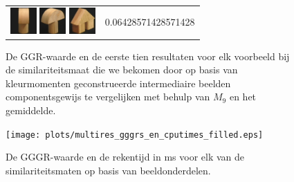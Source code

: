 {\begin{figure}[p]
\begin{tabular}{m{11cm} | m{3cm} |}
\includegraphics[width=1cm]{coil/beeld-5.eps}
\includegraphics[width=1cm]{coil/beeld-3.eps}
\includegraphics[width=1cm]{coil/beeld-45.eps}
& {\scriptsize 0.06428571428571428}
\\
\end{tabular}
\vspace{5pt}
\caption{\label{fig:results_beste_moments_pixelgeb}De GGR-waarde en de eerste tien resultaten 
voor elk voorbeeld bij de similariteitsmaat die we bekomen door op 
basis van kleurmomenten geconstrueerde intermediaire beelden componentsgewijs te vergelijken 
met behulp van $M_{9}$ en het gemiddelde.}
\end{figure}


\begin{figure}[p]
\centering
\texttt{[image: plots/multires\_gggrs\_en\_cputimes\_filled.eps]}
\vspace{1pt}
\caption{\label{fig:multires_gggrs_en_cputimes}De GGGR-waarde en de rekentijd in ms 
voor elk van de similariteitsmaten op basis van 
beeldonderdelen.}
\end{figure}

}
